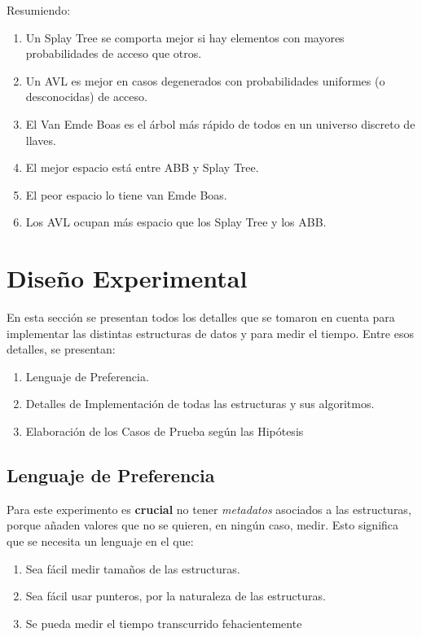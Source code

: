 \documentclass[12pt,letterpaper]{report}
\begin{document}
Resumiendo:

\begin{enumerate}
\item Un Splay Tree se comporta mejor si hay elementos con mayores probabilidades de acceso que otros.
\item Un AVL es mejor en casos degenerados con probabilidades uniformes (o desconocidas) de acceso.
\item El Van Emde Boas es el árbol más rápido de todos en un universo discreto de llaves.
\item El mejor espacio está entre ABB y Splay Tree.
\item El peor espacio lo tiene van Emde Boas.
\item Los AVL ocupan más espacio que los Splay Tree y los ABB.
\end{enumerate}

\section{Diseño Experimental}
En esta sección se presentan todos los detalles que se tomaron en cuenta para implementar las distintas estructuras de datos y para medir el tiempo. Entre esos detalles, se presentan:
\begin{enumerate}
\item Lenguaje de Preferencia.
\item Detalles de Implementación de todas las estructuras y sus algoritmos.
\item Elaboración de los Casos de Prueba según las Hipótesis
\end{enumerate}

\subsection{Lenguaje de Preferencia}
\label{subsec:lenguaje}
Para este experimento es \textbf{crucial} no tener \emph{metadatos} asociados a las estructuras, porque añaden valores que no se quieren, en ningún caso, medir. Esto significa que se necesita un lenguaje en el que:
\begin{enumerate}
\item Sea fácil medir tamaños de las estructuras.
\item Sea fácil usar punteros, por la naturaleza de las estructuras.
\item Se pueda medir el tiempo transcurrido fehacientemente
\end{enumerate}
\end{document}
